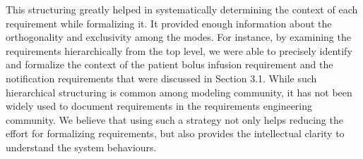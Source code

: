 This structuring greatly helped in systematically determining the context of each requirement while formalizing it. It provided enough information about the orthogonality and exclusivity among the modes. For instance, by examining the requirements hierarchically from the top level, we were able to precisely identify and formalize the context of the patient bolus infusion requirement and the notification requirements that were discussed in Section 3.1. While such hierarchical structuring is common among modeling community, it has not been widely used to document requirements in the requirements engineering community. We believe that using such a strategy not only helps reducing the effort for formalizing requirements, but also provides the intellectual clarity to understand the system behaviours.
%
